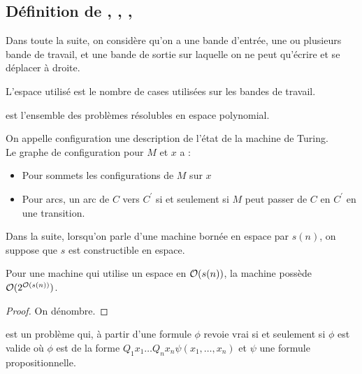 \documentclass{cours}
\begin{document}
\subsection{Définition de , , , }
Dans toute la suite, on considère qu'on a une bande d'entrée, une ou plusieurs bande de travail, et une bande de sortie sur laquelle on ne peut qu'écrire et se déplacer à droite. 
\begin{definition}
    L'espace utilisé est le nombre de cases utilisées sur les bandes de travail. 
\end{definition}

\begin{definition}
     est l'ensemble des problèmes résolubles en espace polynomial. 
\end{definition}


\begin{definition}[Configurations]
    On appelle configuration une description de l'état de la machine de Turing.\\
    Le graphe de configuration pour $M$ et $x$ a : 
    \begin{itemize}
        \item Pour sommets les configurations de $M$ sur $x$
        \item Pour arcs, un arc de $C$ vers $C^{'}$ si et seulement si $M$ peut passer de $C$ en $C^{'}$ en une transition. 
    \end{itemize}
\end{definition}

Dans la suite, lorsqu'on parle d'une machine bornée en espace par $s(n)$, on suppose que $s$ est constructible en espace. 

\begin{proposition}
    Pour une machine qui utilise un espace en $\mathcal{O}(s(n))$, la machine possède $\mathcal{O}(2^{\mathcal{O}(s(n))})$.
\end{proposition}
\begin{proof}
    On dénombre.
\end{proof}

\begin{definition}[QBF]
     est un problème qui, à partir d'une formule $\phi$ revoie vrai si et seulement si $\phi$ est valide où $\phi$ est de la forme $Q_{1}x_{1} \ldots Q_{n}x_{n}\psi(x_{1}, \ldots, x_{n})$ et $\psi$ une formule propositionnelle. 
\end{definition}
\end{document}
